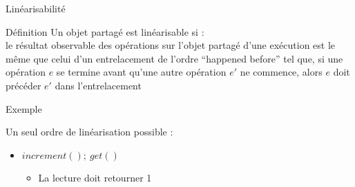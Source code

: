 
\begingroup

\begin{frame}{Linéarisabilité}

  \begin{block}{Définition}
    Un objet partagé est linéarisable si : \\
    le résultat observable des opérations sur l'objet partagé d'une exécution est le même que celui d'un entrelacement de l'ordre ``happened before''
    \alert{tel que, si une opération $e$ se termine avant qu'une autre opération $e'$ ne commence, alors $e$ doit précéder $e'$ dans l'entrelacement}
  \end{block}

  \begin{exampleblock}{Exemple}
    
    \begin{center}
    \end{center}

    Un seul ordre de linéarisation possible : 
    \begin{itemize}
    \item $increment() ;~ get()$
      \begin{itemize}
      \item La lecture doit retourner 1
      \end{itemize}
    \end{itemize}
  \end{exampleblock}

\end{frame}

\endgroup
\endinput
